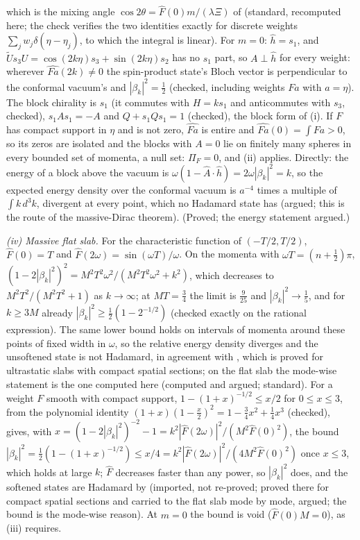 which is the mixing angle $\cos 2\theta = \hat F(0)m/(\lambda\Xi)$ of \cite{FewsterLang2015} (standard, recomputed here; the check verifies the two identities exactly for discrete weights $\sum_{j}w_{j}\delta(\eta - \eta_{j})$, to which the integral is linear). For $m = 0$: $\hat h = s_{1}$, and $\tilde U s_{3}U = \cos(2k\eta)s_{3} + \sin(2k\eta)s_{2}$ has no $s_{1}$ part, so $A \perp \hat h$ for every weight: wherever $\widehat{Fa}(2k) \ne 0$ the spin-product state's Bloch vector is perpendicular to the conformal vacuum's and $|\beta_{k}|^{2} = \tfrac12$ (checked, including weights $F a$ with $a = \eta$). The block chirality is $s_{1}$ (it commutes with $H = ks_{1}$ and anticommutes with $s_{3}$, checked), $s_{1}As_{1} = -A$ and $Q + s_{1}Qs_{1} = 1$ (checked), the block form of (i). If $F$ has compact support in $\eta$ and is not zero, $\widehat{Fa}$ is entire and $\widehat{Fa}(0) = \int Fa > 0$, so its zeros are isolated and the blocks with $A = 0$ lie on finitely many spheres in every bounded set of momenta, a null set: $\Pi_{F} = 0$, and (ii) applies. Directly: the energy of a block above the vacuum is $\omega(1 - \hat A\cdot\hat h) = 2\omega|\beta_{k}|^{2} = k$, so the expected energy density over the conformal vacuum is $a^{-4}$ times a multiple of $\int k\,d^{3}k$, divergent at every point, which no Hadamard state has (argued; this is the route of the massive-Dirac theorem). (Proved; the energy statement argued.)

\emph{(iv) Massive flat slab.} For the characteristic function of $(-T/2, T/2)$, $\hat F(0) = T$ and $\hat F(2\omega) = \sin(\omega T)/\omega$. On the momenta with $\omega T = (n + \tfrac12)\pi$, $(1 - 2|\beta_{k}|^{2})^{2} = M^{2}T^{2}\omega^{2}/(M^{2}T^{2}\omega^{2} + k^{2})$, which decreases to $M^{2}T^{2}/(M^{2}T^{2} + 1)$ as $k \to \infty$; at $MT = \tfrac34$ the limit is $\tfrac{9}{25}$ and $|\beta_{k}|^{2} \to \tfrac15$, and for $k \ge 3M$ already $|\beta_{k}|^{2} \ge \tfrac12(1 - 2^{-1/2})$ (checked exactly on the rational expression). The same lower bound holds on intervals of momenta around these points of fixed width in $\omega$, so the relative energy density diverges and the unsoftened state is not Hadamard, in agreement with \cite[Thm.~3.4]{FewsterLang2015}, which is proved for ultrastatic slabs with compact spatial sections; on the flat slab the mode-wise statement is the one computed here (computed and argued; standard). For a weight $F$ smooth with compact support, $1 - (1 + x)^{-1/2} \le x/2$ for $0 \le x \le 3$, from the polynomial identity $(1 + x)(1 - \tfrac{x}{2})^{2} = 1 - \tfrac34x^{2} + \tfrac14x^{3}$ (checked), gives, with $x = (1 - 2|\beta_{k}|^{2})^{-2} - 1 = k^{2}|\hat F(2\omega)|^{2}/(M^{2}\hat F(0)^{2})$, the bound $|\beta_{k}|^{2} = \tfrac12(1 - (1 + x)^{-1/2}) \le x/4 = k^{2}|\hat F(2\omega)|^{2}/(4M^{2}\hat F(0)^{2})$ once $x \le 3$, which holds at large $k$; $\hat F$ decreases faster than any power, so $|\beta_{k}|^{2}$ does, and the softened states are Hadamard by \cite[Thm.~3.5]{FewsterLang2015} (imported, not re-proved; proved there for compact spatial sections and carried to the flat slab mode by mode, argued; the bound is the mode-wise reason). At $m = 0$ the bound is void ($\hat F(0)M = 0$), as (iii) requires.

